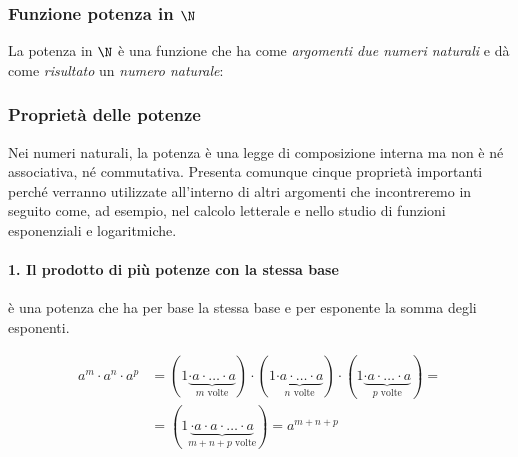 
\subsubsection{Funzione potenza in \texorpdfstring{$\N$}{N}} 
\indc{\(\N\)}{\(\coppia{\N}{\uparrow}\)}

La potenza in \(\N\) è una funzione che ha come 
\emph{argomenti due numeri naturali} 
e dà come \emph{risultato} un \emph{numero naturale}:



\subsubsection{Proprietà delle potenze}

Nei numeri naturali, la potenza è una legge di composizione interna 
 ma non è né associativa, né 
commutativa.
Presenta comunque cinque proprietà importanti perché verranno utilizzate 
all'interno di altri argomenti che incontreremo in seguito come, ad 
esempio, nel calcolo letterale e nello studio di funzioni esponenziali e 
logaritmiche.

\paragraph{1. Il prodotto di più potenze con la stessa base} 
è una potenza che ha per base la stessa base e per esponente la somma 
degli esponenti.

\begin{align*}
a^m \cdot a^n \cdot a^p &= 
  (1 \underbrace{\cdot a \cdot \ldots \cdot a}_{m \text{ volte}}) 
\cdot 
  (1 \underbrace{\cdot a \cdot \ldots \cdot a}_{n \text{ volte}}) 
\cdot 
  (1 \underbrace{\cdot a \cdot \ldots \cdot a}_{p \text{ volte}}) =\\
&= (1 \underbrace{\cdot a \cdot a \cdot \ldots 
    \cdot a}_{m+n+p\text{ volte}}) = a^{m+n+p}
\end{align*}

